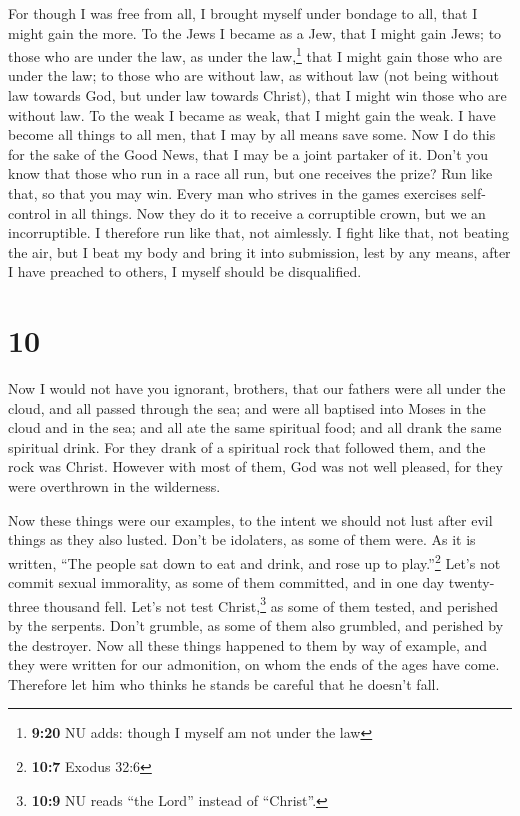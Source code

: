  For though I was free from all, I brought myself under
bondage to all, that I might gain the more.  To the Jews
I became as a Jew, that I might gain Jews; to those who are under the
law, as under the law,\footnote{\textbf{9:20} NU adds: though I myself
  am not under the law} that I might gain those who are under the law;
 to those who are without law, as without law (not being
without law towards God, but under law towards Christ), that I might win
those who are without law.  To the weak I became as weak,
that I might gain the weak. I have become all things to all men, that I
may by all means save some.  Now I do this for the sake
of the Good News, that I may be a joint partaker of it. 
Don't you know that those who run in a race all run, but one receives
the prize? Run like that, so that you may win.  Every man
who strives in the games exercises self-control in all things. Now they
do it to receive a corruptible crown, but we an incorruptible.
 I therefore run like that, not aimlessly. I fight like
that, not beating the air,  but I beat my body and bring
it into submission, lest by any means, after I have preached to others,
I myself should be disqualified.

\hypertarget{section-9}{%
\section{10}\label{section-9}}

 Now I would not have you ignorant, brothers, that our
fathers were all under the cloud, and all passed through the sea;
 and were all baptised into Moses in the cloud and in the
sea;  and all ate the same spiritual food; 
and all drank the same spiritual drink. For they drank of a spiritual
rock that followed them, and the rock was Christ.  However
with most of them, God was not well pleased, for they were overthrown in
the wilderness.

 Now these things were our examples, to the intent we
should not lust after evil things as they also lusted. 
Don't be idolaters, as some of them were. As it is written, ``The people
sat down to eat and drink, and rose up to play.''\footnote{\textbf{10:7}
  Exodus 32:6}  Let's not commit sexual immorality, as
some of them committed, and in one day twenty-three thousand fell.
 Let's not test Christ,\footnote{\textbf{10:9} NU reads
  ``the Lord'' instead of ``Christ''.} as some of them tested, and
perished by the serpents.  Don't grumble, as some of them
also grumbled, and perished by the destroyer.  Now all
these things happened to them by way of example, and they were written
for our admonition, on whom the ends of the ages have come.
 Therefore let him who thinks he stands be careful that
he doesn't fall.


